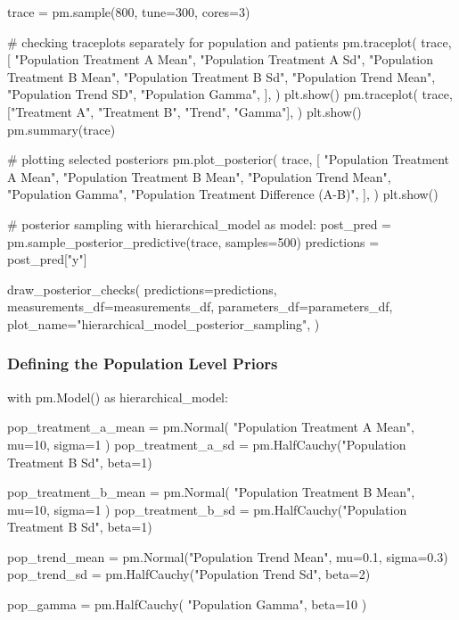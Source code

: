 \documentclass[12pt,a4paper,leqno]{report}
\theoremstyle{plain}
\theoremstyle{definition}
\theoremstyle{remark}
\begin{document}
\begin{pyverbatim}
    trace = pm.sample(800, tune=300, cores=3)

    # checking traceplots separately for population and patients
    pm.traceplot(
        trace,
        [
            "Population Treatment A Mean",
            "Population Treatment A Sd",
            "Population Treatment B Mean",
            "Population Treatment B Sd",
            "Population Trend Mean",
            "Population Trend SD",
            "Population Gamma",
        ],
    )
    plt.show()
    pm.traceplot(
        trace, ["Treatment A", "Treatment B", "Trend", "Gamma"],
    )
    plt.show()
    pm.summary(trace)

    # plotting selected posteriors
    pm.plot_posterior(
        trace,
        [
            "Population Treatment A Mean",
            "Population Treatment B Mean",
            "Population Trend Mean",
            "Population Gamma",
            "Population Treatment Difference (A-B)",
        ],
    )
    plt.show()


# posterior sampling
with hierarchical_model as model:
    post_pred = pm.sample_posterior_predictive(trace, samples=500)
    predictions = post_pred["y"]

draw_posterior_checks(
    predictions=predictions,
    measurements_df=measurements_df,
    parameters_df=parameters_df,
    plot_name="hierarchical_model_posterior_sampling",
)
\end{pyverbatim}
\bigskip

\subsubsection{Defining the Population Level Priors}
\bigskip
\begin{pyverbatim}
with pm.Model() as hierarchical_model:

    pop_treatment_a_mean = pm.Normal(
        "Population Treatment A Mean", mu=10, sigma=1
    )
    pop_treatment_a_sd = pm.HalfCauchy("Population Treatment B Sd", beta=1)

    pop_treatment_b_mean = pm.Normal(
        "Population Treatment B Mean", mu=10, sigma=1
    )
    pop_treatment_b_sd = pm.HalfCauchy("Population Treatment B Sd", beta=1)

    pop_trend_mean = pm.Normal("Population Trend Mean", mu=0.1, sigma=0.3)
    pop_trend_sd = pm.HalfCauchy("Population Trend Sd", beta=2)

    pop_gamma = pm.HalfCauchy(
        "Population Gamma", beta=10
    )
\end{pyverbatim}
\bigskip
\end{document}
